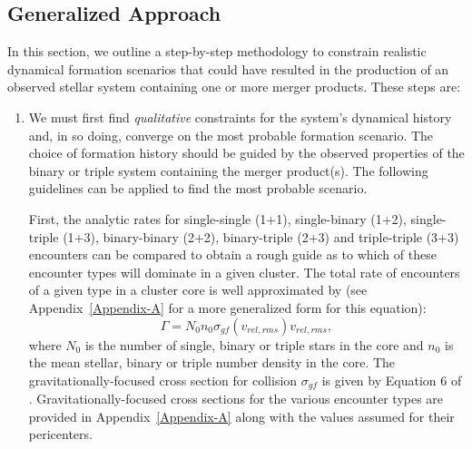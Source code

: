 \subsection{Generalized Approach} \label{general2}

In this section, we outline a step-by-step
methodology to constrain realistic dynamical formation scenarios
that could have resulted in the production of an observed
stellar system containing one or more merger products.  These steps
are: 

\begin{enumerate}

\item We must first find \textit{qualitative} constraints for the
system's dynamical history and, in so doing, converge on the most
probable formation scenario.  The choice of 
formation history should be guided by the observed properties of the
binary or triple system containing the merger product(s).  The following
guidelines can be applied to find the most probable scenario.

First, the analytic rates for single-single (1+1), single-binary (1+2),
single-triple (1+3), binary-binary (2+2), binary-triple (2+3) and
triple-triple (3+3) encounters can be
compared to obtain a rough guide as to which of these encounter
types will dominate in a given cluster.  The total rate of
encounters of a given type in a
cluster core is well approximated by \citep{leonard89} (see
Appendix~\ref{Appendix-A} for a more generalized form for this
equation):
\begin{equation}
\label{eqn:coll-rate}
\Gamma = N_0n_0\sigma_{gf}(v_{rel,rms})v_{rel,rms},
\end{equation}
where $N_0$ is the number of single, binary or triple stars in the
core and $n_0$ is the mean stellar, binary or triple number density in
the core.  The gravitationally-focused cross section for collision
$\sigma_{gf}$ is given by Equation 6 of \citet{leonard89}.
Gravitationally-focused cross sections for the various encounter types
are provided in Appendix~\ref{Appendix-A} along with the values assumed
for their pericenters.


\end{enumerate}
